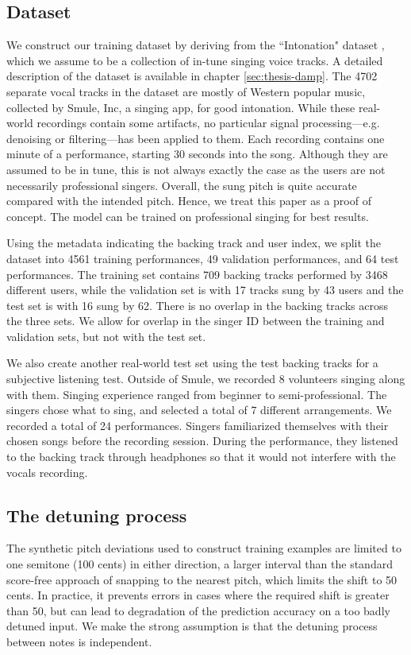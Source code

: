\subsection{Dataset}
\label{sec:dataset-autotune}
We construct our training dataset by deriving from the ``Intonation" dataset \cite{wager2018intonation}, which we assume to be a collection of in-tune singing voice tracks. A detailed description of the dataset is available in chapter \ref{sec:thesis-damp}. The 4702 separate vocal tracks in the dataset are mostly of Western popular music, collected by Smule, Inc, a singing app, for good intonation. While these real-world recordings contain some artifacts, no particular signal processing---e.g. denoising or filtering---has been applied to them. Each recording contains one minute of a performance, starting 30 seconds into the song. Although they are assumed to be in tune, this is not always exactly the case as the users are not necessarily professional singers. Overall, the sung pitch is quite accurate compared with the intended pitch. Hence, we treat this paper as a proof of concept. The model can be trained on professional singing for best results.

Using the metadata indicating the backing track and user index, we split the dataset into 4561 training performances, 49 validation performances, and 64 test performances. The training set contains 709 backing tracks performed by 3468 different users, while the validation set is with 17 tracks sung by 43 users and the test set is with 16 sung by 62. There is no overlap in the backing tracks across the three sets. We allow for overlap in the singer ID between the training and validation sets, but not with the test set. 

We also create another real-world test set using the test backing tracks for a subjective listening test. Outside of Smule, we recorded 8 volunteers singing along with them. Singing experience ranged from beginner to semi-professional. The singers chose what to sing, and selected a total of 7 different arrangements. We recorded a total of 24 performances. Singers familiarized themselves with their chosen songs before the recording session. During the performance, they listened to the backing track through headphones so that it would not interfere with the vocals recording. 

\subsection{The detuning process}
The synthetic pitch deviations used to construct training examples are limited to one semitone (100 cents) in either direction, a larger interval than the standard score-free approach of snapping to the nearest pitch, which limits the shift to 50 cents. In practice, it prevents errors in cases where the required shift is greater than 50, but can lead to degradation of the prediction accuracy on a too badly detuned input. We make the strong assumption is that the detuning process between notes is independent.


